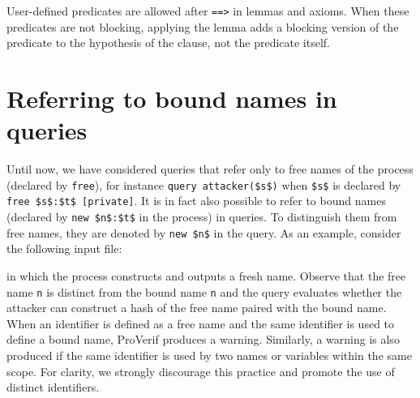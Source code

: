 \documentclass{book}
\begin{document}
User-defined predicates are allowed after \lstinline!==>! in lemmas
and axioms. When these predicates are not blocking, applying the lemma
adds a blocking version of the predicate to the hypothesis of the clause,
not the predicate itself.

\section{Referring to bound names in queries}\label{sec:refinedqueries}

Until now, we have considered queries that refer only to free names of
the process (declared by \lstinline!free!), for instance
\lstinline!query attacker($s$)! when \lstinline!$s$! is declared by
\lstinline!free $s$:$t$ [private]!. It is in fact also possible to refer
to bound names (declared by \lstinline!new $n$:$t$! in the process) in
queries. To distinguish them from free names, they are denoted by
\lstinline!new $n$! in the query.  As an example, consider the following
input file:
%

%
in which the process constructs and outputs a fresh name. Observe that
the free name \lstinline!n! is distinct from the bound name
\lstinline!n! and the query
evaluates whether the attacker can construct a hash of the free name
paired with the bound name.  When an identifier is defined as a
free name and the same identifier is used to define a bound name,
ProVerif produces a warning. Similarly, a warning is also produced if
the same identifier is used by two names or variables within the same
scope. For clarity, we strongly discourage this practice and promote
the use of distinct identifiers.
\end{document}
